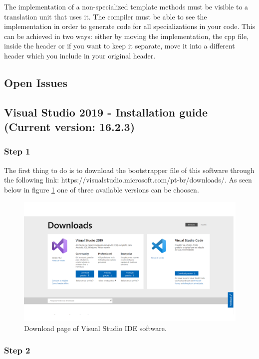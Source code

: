 \begin{refsection}
The implementation of a non-specialized template methods must be visible to a translation unit that uses it. The compiler must be able to see the implementation in order to generate code for all specializations in your code. This can be achieved in two ways: either by moving the implementation, the cpp file, inside the header or if you want to keep it separate, move it into a different header which you include in your original header.


\subsection{Open Issues}

\clearpage
\subsection{Visual Studio 2019 - Installation guide (Current version: 16.2.3)}

\subsubsection{Step 1}

The first thing to do is to download the bootstrapper file of this software through the following link: https://visualstudio.microsoft.com/pt-br/downloads/. As seen below in figure \ref{vstudio} one of three available versions can be choosen.

\begin{figure}[H]
	\centering
	\includegraphics[width=1\linewidth]{./sdf/arduino_quantum_rx/figures/vsDownload.pdf}
	\caption{Download page of Visual Studio IDE software.}
	\label{vstudio}
\end{figure}


\subsubsection{Step 2}


\end{refsection}
